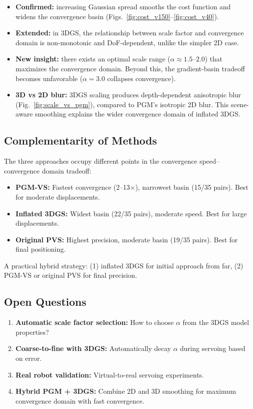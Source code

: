 \documentclass[11pt]{article}
\begin{document}
\begin{itemize}
    \item \textbf{Confirmed:} increasing Gaussian spread smooths the cost function and widens the convergence basin (Figs.~\ref{fig:cost_v150}--\ref{fig:cost_v40}).
    \item \textbf{Extended:} in 3DGS, the relationship between scale factor and convergence domain is non-monotonic and DoF-dependent, unlike the simpler 2D case.
    \item \textbf{New insight:} there exists an optimal scale range ($\alpha \approx 1.5$--$2.0$) that maximizes the convergence domain. Beyond this, the gradient-basin tradeoff becomes unfavorable ($\alpha = 3.0$ collapses convergence).
    \item \textbf{3D vs 2D blur:} 3DGS scaling produces depth-dependent anisotropic blur (Fig.~\ref{fig:scale_vs_pgm}), compared to PGM's isotropic 2D blur. This scene-aware smoothing explains the wider convergence domain of inflated 3DGS.
\end{itemize}

\subsection{Complementarity of Methods}

The three approaches occupy different points in the convergence speed--convergence domain tradeoff:
\begin{itemize}
    \item \textbf{PGM-VS:} Fastest convergence (2--13$\times$), narrowest basin (15/35 pairs). Best for moderate displacements.
    \item \textbf{Inflated 3DGS:} Widest basin (22/35 pairs), moderate speed. Best for large displacements.
    \item \textbf{Original PVS:} Highest precision, moderate basin (19/35 pairs). Best for final positioning.
\end{itemize}

A practical hybrid strategy: (1) inflated 3DGS for initial approach from far, (2) PGM-VS or original PVS for final precision.

\subsection{Open Questions}

\begin{enumerate}
    \item \textbf{Automatic scale factor selection:} How to choose $\alpha$ from the 3DGS model properties?
    \item \textbf{Coarse-to-fine with 3DGS:} Automatically decay $\alpha$ during servoing based on error.
    \item \textbf{Real robot validation:} Virtual-to-real servoing experiments.
    \item \textbf{Hybrid PGM + 3DGS:} Combine 2D and 3D smoothing for maximum convergence domain with fast convergence.
\end{enumerate}
\end{document}
